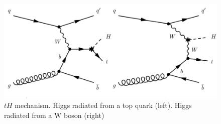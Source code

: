 \begin{figure}[ht]
	\centering
	\includegraphics[scale=0.5]{Chapter1/newtHq.png}
	\caption[$tH$ mechanism]{$tH$ mechanism. Higgs radiated from a top quark (left). Higgs radiated from a W boson (right) \protect \cite{bb}} \label{newth}
\end{figure}
\pagebreak














